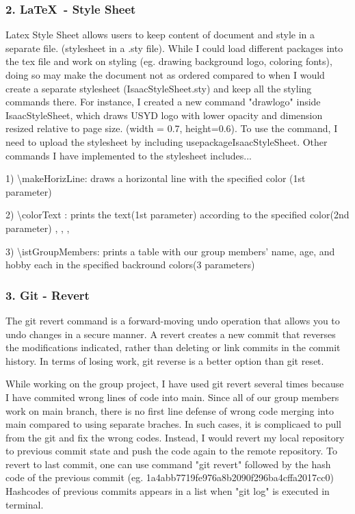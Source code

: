 \documentclass[a4paper, 11pt]{report}
\begin{document}
\subsubsection{2. \LaTeX\ - Style Sheet}
Latex Style Sheet allows users to keep content of document and style in a separate file. (stylesheet in a .sty file). While I could load different packages into the tex file and work on styling (eg. drawing background logo, coloring fonts), doing so may make the document not as ordered compared to when I would create a separate stylesheet (IsaacStyleSheet.sty) and keep all the styling commands there. For instance, I created a new command "drawlogo" inside IsaacStyleSheet, which draws USYD logo with lower opacity and dimension resized relative to page size. (width = 0.7, height=0.6). To use the command, I need to upload the stylesheet by including usepackage{IsaacStyleSheet}. Other commands I have implemented to the stylesheet includes... 

1) \textbackslash makeHorizLine: draws a horizontal line with the specified color (1st parameter)

2) \textbackslash colorText : prints the text(1st parameter) according to the specified color(2nd parameter)
, , , 

3) \textbackslash istGroupMembers: prints a table with our group members' name, age, and hobby each in the specified backround colors(3  parameters)

\subsubsection{3. Git - Revert}
The git revert command is a forward-moving undo operation that allows you to undo changes in a secure manner. A revert creates a new commit that reverses the modifications indicated, rather than deleting or link commits in the commit history.\cite{isaac12} In terms of losing work, git reverse is a better option than git reset.\cite{isaac12}

While working on the group project, I have used git revert several times because I have commited wrong lines of code into main. Since all of our group members work on main branch, there is no first line defense of wrong code merging into main compared to using separate braches. In such cases, it is complicaed to pull from the git and fix the wrong codes. Instead, I would revert my local repository to previous commit state and push the code again to the remote repository. To revert to last commit, one can use command "git revert" followed by the hash code of the previous commit (eg. 1a4abb7719fe976a8b2090f296ba4cffa2017cc0) Hashcodes of previous commits appears in a list when "git log" is executed in terminal.
\end{document}
